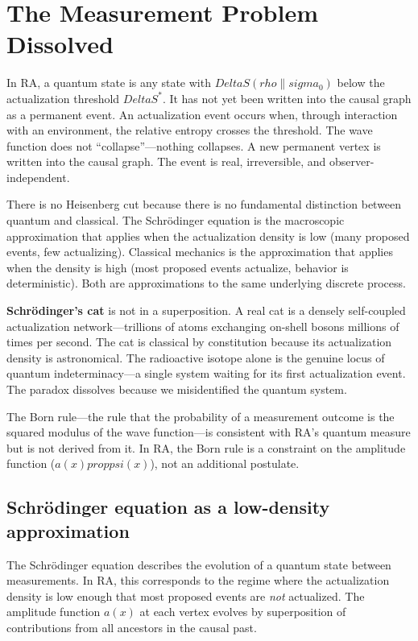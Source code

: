 \documentclass[11pt]{article}
\def\Delta{Delta}%
\def\rho{rho}%
\def\sigma{sigma}%
\def\psi{psi}%
\def\propto{prop}%
\begin{document}
\section{The Measurement Problem Dissolved}
\label{sec:measurement}

In RA, a quantum state is any state with $\Delta S(\rho\|\sigma_0)$ below the actualization threshold $\Delta S^*$. It has not yet been written into the causal graph as a permanent event. An actualization event occurs when, through interaction with an environment, the relative entropy crosses the threshold. The wave function does not ``collapse''---nothing collapses. A new permanent vertex is written into the causal graph. The event is real, irreversible, and observer-independent.

There is no Heisenberg cut because there is no fundamental distinction between quantum and classical. The Schr\"odinger equation is the macroscopic approximation that applies when the actualization density is low (many proposed events, few actualizing). Classical mechanics is the approximation that applies when the density is high (most proposed events actualize, behavior is deterministic). Both are approximations to the same underlying discrete process.

\textbf{Schr\"odinger's cat} is not in a superposition. A real cat is a densely self-coupled actualization network---trillions of atoms exchanging on-shell bosons millions of times per second. The cat is classical by constitution because its actualization density is astronomical. The radioactive isotope alone is the genuine locus of quantum indeterminacy---a single system waiting for its first actualization event. The paradox dissolves because we misidentified the quantum system.

The Born rule---the rule that the probability of a measurement outcome is the squared modulus of the wave function---is consistent with RA's quantum measure but is not derived from it. In RA, the Born rule is a constraint on the amplitude function ($a(x)\propto\psi(x)$), not an additional postulate.

\subsection{Schr\"odinger equation as a low-density approximation}
\label{sec:schrodinger_limit}

The Schr\"odinger equation describes the evolution of a quantum state between measurements. In RA, this corresponds to the regime where the actualization density is low enough that most proposed events are \emph{not} actualized. The amplitude function $a(x)$ at each vertex evolves by superposition of contributions from all ancestors in the causal past.
\end{document}

